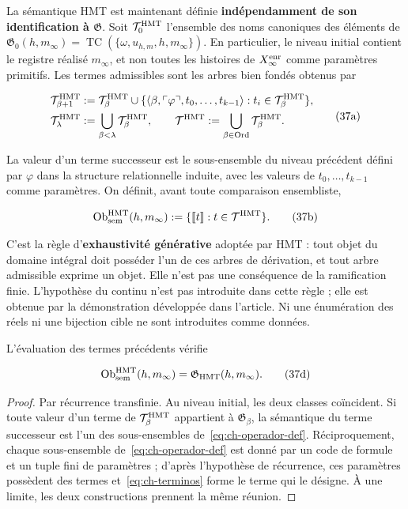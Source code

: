 La sémantique HMT est maintenant définie \textbf{indépendamment de son identification à \(\mathfrak G\)}. Soit \(\mathcal T_0^{\rm HMT}\) l'ensemble des noms canoniques des éléments de \(\mathfrak G_0(h,m_\infty)=
\operatorname{TC}(\{\omega,u_{h,m},h,m_\infty\})\). En particulier, le niveau initial contient le registre réalisé \(m_\infty\), et non toutes les histoires de \(X_\infty^{\rm enr}\) comme paramètres primitifs. Les termes admissibles sont les arbres bien fondés obtenus par

\[
 \begin{aligned}
 \mathcal T^{\rm HMT}_{\beta+1}
 &:={\mathcal T}^{\rm HMT}_\beta\cup
 \{\langle\beta,\ulcorner\varphi\urcorner,
       t_0,\ldots,t_{k-1}\rangle:
       t_i\in\mathcal T^{\rm HMT}_\beta\},\\
 \mathcal T^{\rm HMT}_\lambda&:=
       \bigcup_{\beta<\lambda}\mathcal T^{\rm HMT}_\beta,
 \qquad
 \mathcal T^{\rm HMT}:=
       \bigcup_{\beta\in\operatorname{Ord}}\mathcal T^{\rm HMT}_\beta.
 \end{aligned}
\tag{37a}\label{eq:ch-terminos}
\]

La valeur d’un terme successeur est le sous-ensemble du niveau précédent défini
par \(\varphi\) dans la structure relationnelle induite, avec les valeurs de
\(t_0,\ldots,t_{k-1}\) comme paramètres. On définit, avant toute
comparaison ensembliste,

\[
 \operatorname{Ob}_{\rm sem}^{\rm HMT}(h,m_\infty)
 :=\{\llbracket t\rrbracket:t\in\mathcal T^{\rm HMT}\}.
\tag{37b}\label{eq:ch-objetos-semanticos}
\]

C'est la règle d'\textbf{exhaustivité générative} adoptée par HMT : tout objet du domaine intégral doit posséder l'un de ces arbres de dérivation, et tout arbre admissible exprime un objet. Elle n'est pas une conséquence de la ramification finie. L'hypothèse du continu n'est pas introduite dans cette règle ; elle est obtenue par la démonstration développée dans l'article. Ni une énumération des réels ni une bijection cible ne sont introduites comme données.

\begin{theorem}
\label{thm:ch-6a}
L’évaluation des
termes précédents vérifie

\[
 \operatorname{Ob}_{\rm sem}^{\rm HMT}(h,m_\infty)
 =\mathfrak G_{\rm HMT}(h,m_\infty).
\tag{37d}\label{eq:ch-equivalencia-semantica}
\]

\end{theorem}
\begin{proof}
Par récurrence transfinie. Au niveau initial, les deux classes coïncident. Si toute valeur d'un terme de \(\mathcal T^{\rm HMT}_\beta\) appartient à \(\mathfrak G_\beta\), la sémantique du terme successeur est l'un des sous-ensembles de~\eqref{eq:ch-operador-def}. Réciproquement, chaque sous-ensemble de~\eqref{eq:ch-operador-def} est donné par un code de formule et un tuple fini de paramètres ; d'après l'hypothèse de récurrence, ces paramètres possèdent des termes et~\eqref{eq:ch-terminos} forme le terme qui le désigne. À une limite, les deux constructions prennent la même réunion.
\end{proof}

